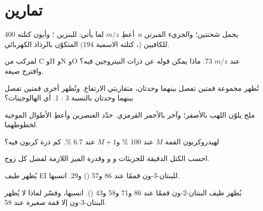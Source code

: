 \section{تمارين}

\begin{exercise}[$\star$]\label{exo:b2:mass-spec-atomic:1}
أعطِ $m/z$ لما يأتي:  للبنزين ؛ وأيون كتلته \qty{400}{u} يحمل
شحنتين؛ والجزيء المبرتن للكافيين (، كتلته الاسمية 194) المتكوّن بالرذاذ الكهربائي.
\end{exercise}

\begin{exercise}[$\star$]\label{exo:b2:mass-spec-atomic:2}
لمركب من C وH وN وO  عند $m/z$ 73. ماذا يمكن قوله عن ذرات النيتروجين فيه؟
واقترح صيغة.
\end{exercise}

\begin{exercise}[$\star$]\label{exo:b2:mass-spec-atomic:3}
تُظهر مجموعة  قمتين تفصل بينهما وحدتان، متقاربتي الارتفاع. وتُظهر أخرى قمتين
تفصل بينهما وحدتان بالنسبة 3 : 1. أي الهالوجينات؟
\end{exercise}

\begin{exercise}[$\star$]\label{exo:b2:mass-spec-atomic:4}
ملح يلوّن اللهب بالأصفر؛ وآخر بالأحمر القرمزي. حدّد العنصرين وأعطِ الأطوال الموجية
لخطوطهما.
\end{exercise}

\begin{exercise}[$\star\star$]\label{exo:b2:mass-spec-atomic:5}
لهيدروكربون القمة $M$ عند 100 \% و$M+1$ عند 6.7 \%. كم ذرة كربون فيه؟
\end{exercise}

\begin{exercise}[$\star\star$]\label{exo:b2:mass-spec-atomic:6}
احسب الكتل الدقيقة للجزيئات  و و وقدرة الميز اللازمة لفصل
كل زوج.
\end{exercise}

\begin{exercise}[$\star\star$]\label{exo:b2:mass-spec-atomic:7}
يُظهر طيف EI للبنتان-3-ون قممًا عند 86 و57 () و29. انسبها.
\end{exercise}

\begin{exercise}[$\star\star$]\label{exo:b2:mass-spec-atomic:8}
يُظهر طيف البنتان-2-ون قممًا عند 86 و71 و58 و43 (). انسبها، وفسّر
لماذا لا يُظهر البنتان-3-ون إلا قمة صغيرة عند 58.
\end{exercise}

